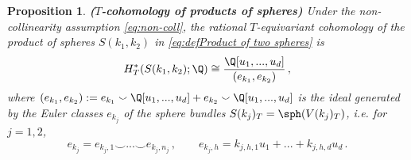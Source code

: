 \documentclass[11pt,a4paper,reqno]{article}
\numberwithin{equation}{section}
\newtheorem{proposition}[theorem]{Proposition}
\theoremstyle{definition}
\newtheorem{remark}[theorem]{Remark}
\begin{document}



\begin{proposition}\label{p:cohomology_sphere_product}
{\bf ($ T $-cohomology of products of spheres)}
Under the non-collinearity assumption \eqref{eq:non-coll}, the rational $T$-equivariant cohomology of the product of spheres $S(k_1,k_2)$ in \eqref{eq:defProduct of two spheres} is 
\begin{equation}\label{prop323}
H^*_T(S(k_1,k_2);\Q)\cong \frac{\Q[u_1,...,u_d]}{(e_{k_1},e_{k_2})} \, ,
\end{equation}
where $(e_{k_1},e_{k_2}):=e_{k_1}\smallsmile \Q[u_1,...,u_d]+e_{k_2}\smallsmile \Q[u_1,...,u_d] $ is the ideal generated by the Euler classes $e_{k_j}$ of the sphere bundles $ S(k_j)_T =\sph(V(k_j)_T)$, i.e. for $ j = 1,2 $,  
\begin{equation}\label{ekj}
e_{k_j}=e_{k_j,1}\smallsmile...\smallsmile e_{k_j,n_j} \, , 
\qquad 
 e_{k_j,h} = k_{j,h,1}u_1+...+k_{j,h,d}u_d\,.
\end{equation}
\end{proposition}
\end{document}
